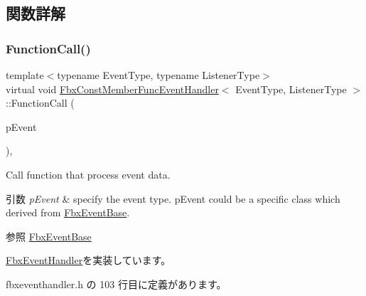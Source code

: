 \subsection{関数詳解}
\mbox{\label{class_fbx_const_member_func_event_handler_ae6c6805404e8045de40289893709dc54}} 
\subsubsection{\texorpdfstring{Function\+Call()}{FunctionCall()}}
{\footnotesize\ttfamily template$<$typename Event\+Type, typename Listener\+Type$>$ \\
virtual void \hyperlink{class_fbx_const_member_func_event_handler}{Fbx\+Const\+Member\+Func\+Event\+Handler}$<$ Event\+Type, Listener\+Type $>$\+::Function\+Call (\begin{DoxyParamCaption}\item[{const \hyperlink{class_fbx_event_base}{Fbx\+Event\+Base} \&}]{p\+Event }\end{DoxyParamCaption})\hspace{0.3cm}{\ttfamily [inline]}, {\ttfamily [virtual]}}

Call function that process event data. 
\begin{DoxyParams}{引数}
{\em p\+Event} & specify the event type. p\+Event could be a specific class which derived from \hyperlink{class_fbx_event_base}{Fbx\+Event\+Base}. \\
\hline
\end{DoxyParams}
\begin{DoxySeeAlso}{参照}
\hyperlink{class_fbx_event_base}{Fbx\+Event\+Base} 
\end{DoxySeeAlso}


\hyperlink{class_fbx_event_handler_a46357ba45116a30c8f53c3e5fe9ba2fb}{Fbx\+Event\+Handler}を実装しています。



 fbxeventhandler.\+h の 103 行目に定義があります。

\mbox{\label{class_fbx_const_member_func_event_handler_ac88157f51fa72cba959f31dfbcdee4a5}} 
